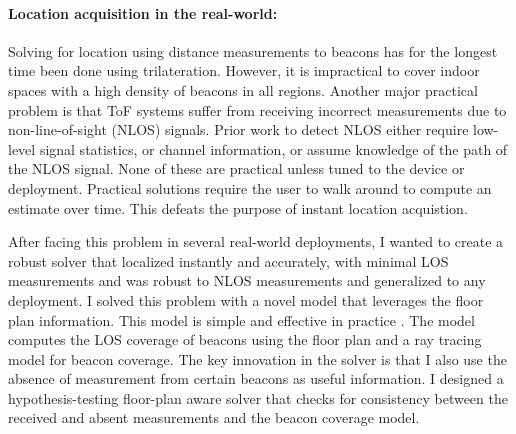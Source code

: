 \documentclass[10pt]{article}
\begin{document}
\paragraph{Location acquisition in the real-world: }
Solving for location using distance measurements to beacons has for the longest time been done using trilateration. However, it is impractical to cover indoor spaces with a high density of beacons in all regions. Another major practical problem is that ToF systems suffer from receiving incorrect measurements due to 
non-line-of-sight (NLOS) signals. 
Prior work to detect NLOS either require low-level signal statistics, or channel information, or assume knowledge of the path of the NLOS signal. None of these are practical unless tuned to the device or deployment. Practical solutions require the user to walk around to compute an estimate over time. This defeats the purpose of instant location acquistion.  %

After facing this problem in several real-world deployments, I wanted to create a robust solver that localized instantly and accurately, with minimal LOS measurements and was robust to NLOS measurements and generalized to any deployment. I solved this problem with a novel model that leverages the floor plan information. This model is simple and effective in practice \cite{rajagopal2018enhancing}. The model computes the LOS coverage of beacons using the floor plan and a ray tracing model for beacon coverage. 
The key innovation in the solver is that I also use the absence of measurement from certain beacons as useful information. I designed a hypothesis-testing floor-plan aware solver that checks for consistency between the received and absent measurements and the beacon coverage model.
\end{document}
